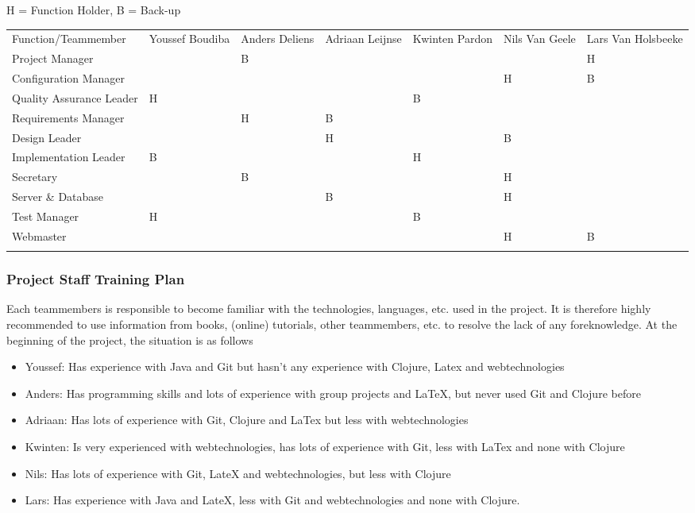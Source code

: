 \documentclass[12pt]{article}
\begin{document}
 H = Function Holder, B = Back-up

\begin{longtabu}[c]{@{}lXXXXXX@{}}
\hline\noalign{\medskip}
Function/Teammember & Youssef Boudiba & Anders Deliens & Adriaan Leijnse
& Kwinten Pardon & Nils Van Geele & Lars Van Holsbeeke
\\\noalign{\medskip}
\hline\noalign{\medskip}
Project Manager & & B & & & & H
\\\noalign{\medskip}
Configuration Manager & & & & & H & B
\\\noalign{\medskip}
Quality Assurance Leader & H & & & B &
\\\noalign{\medskip}
Requirements Manager & & H & B & &
\\\noalign{\medskip}
Design Leader & & & H & & B
\\\noalign{\medskip}
Implementation Leader & B & & & H &
\\\noalign{\medskip}
Secretary & & B & & & H
\\\noalign{\medskip}
Server \& Database & & & B & & H
\\\noalign{\medskip}
Test Manager & H & & & B &
\\\noalign{\medskip}
Webmaster & & & & & H & B
\\\noalign{\medskip}
\hline
\end{longtabu}

\subsubsection{Project Staff Training
Plan}\label{project-staff-training-plan}

Each teammembers is responsible to become familiar with the
technologies, languages, etc. used in the project. It is therefore
highly recommended to use information from books, (online) tutorials,
other teammembers, etc. to resolve the lack of any foreknowledge. At the
beginning of the project, the situation is as follows

\begin{itemize}
\itemsep1pt\parskip0pt
\item
  Youssef: Has experience with Java and Git but hasn't any experience
  with Clojure, Latex and webtechnologies
\item
  Anders: Has programming skills and lots of experience with group
  projects and LaTeX, but never used Git and Clojure before
\item
  Adriaan: Has lots of experience with Git, Clojure and LaTex but less
  with webtechnologies
\item
  Kwinten: Is very experienced with webtechnologies, has lots of
  experience with Git, less with LaTex and none with Clojure
\item
  Nils: Has lots of experience with Git, LateX and webtechnologies, but
  less with Clojure
\item
  Lars: Has experience with Java and LateX, less with Git and
  webtechnologies and none with Clojure.
\end{itemize}
\end{document}
